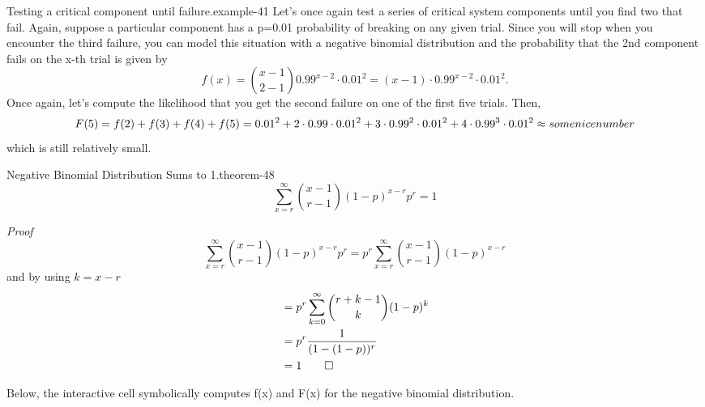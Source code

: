 \documentclass[10pt,]{book}
\makeatletter
\renewcommand*{\proofname}{Proof}
\renewenvironment{proof}[1][\proofname]{\par
  \pushQED{\qed}%
  \normalfont \topsep6\p@\@plus6\p@\relax
  \trivlist
  \item\relax
    {\itshape
    #1\@addpunct{.}}\hspace\labelsep\ignorespaces
}{%
  \popQED\endtrivlist\@endpefalse
}
\numberwithin{equation}{section}
\makeatother
\begin{document}
\begin{example}{Testing a critical component until failure.}{example-41}%
\hypertarget{p-979}{}%
Let's once again test a series of critical system components until you find two that fail. Again, suppose a particular component has a p=0.01 probability of breaking on any given trial. Since you will stop when you encounter the third failure, you can model this situation with a negative binomial distribution and the probability that the 2nd component fails on the x-th trial is given by%
\begin{equation*}
f(x) = \binom{x-1}{2-1} 0.99^{x-2} \cdot 0.01^2 = (x-1) \cdot 0.99^{x-2} \cdot 0.01^2.
\end{equation*}
Once again, let's compute the likelihood that you get the second failure on one of the first five trials. Then,%
\begin{equation*}
F(5) = f(2)+f(3)+f(4)+f(5) \\ = 0.01^2 + 2 \cdot 0.99 \cdot 0.01^2 + 3 \cdot 0.99^2 \cdot 0.01^2 + 4 \cdot 0.99^3 \cdot 0.01^2 \approx some nice number
\end{equation*}
which is still relatively small.%
\end{example}
\hypertarget{p-980}{}%
\begin{theorem}{Negative Binomial Distribution Sums to 1.}{}{theorem-48}%
\hypertarget{p-981}{}%
%
\begin{equation*}
\sum_{x=r}^{\infty} {\binom{x - 1}{r-1}(1-p)^{x-r}p^r} = 1
\end{equation*}
%
\end{theorem}
\begin{proof}\hypertarget{proof-51}{}
\hypertarget{p-982}{}%
%
\begin{equation*}
\sum_{x=r}^{\infty} {\binom{x - 1}{r-1}(1-p)^{x-r}p^r} = p^r \sum_{x=r}^{\infty} {\binom{x - 1}{r-1}(1-p)^{x-r}}
\end{equation*}
\hypertarget{p-983}{}%
and by using \(k = x-r\)%
%
\begin{align*}
& = p^r \sum_{k=0}^{\infty} {\binom{r + k - 1}{k}(1-p)^k}\\
& = p^r \frac{1}{(1-(1-p))^r}\\
& = 1\qedhere
\end{align*}
%
\end{proof}
%
\par
\hypertarget{p-984}{}%
Below, the interactive cell symbolically computes f(x) and F(x) for the negative binomial distribution.%
\par
\hypertarget{p-985}{}%
\leavevmode%
\end{document}
